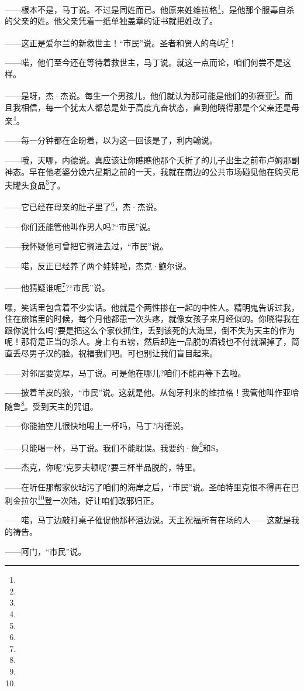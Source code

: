 \par ——根本不是，马丁说。不过是同姓而已。他原来姓维拉格\footnote{}，是他那个服毒自杀的父亲的姓。他父亲凭着一纸单独盖章的证书就把姓改了。
\par ——这正是爱尔兰的新救世主！“市民”说。圣者和贤人的岛屿\footnote{}！
\par ——喏，他们至今还在等待着救世主，马丁说。就这一点而论，咱们何尝不是这样。
\par ——是呀，杰·杰说。每生一个男孩儿，他们就认为那可能是他们的弥赛亚\footnote{}。而且我相信，每一个犹太人都总是处于高度亢奋状态，直到他晓得那是个父亲还是母亲\footnote{}。
\par ——每一分钟都在企盼着，以为这一回该是了，利内翰说。
\par ——哦，天哪，内德说。真应该让你瞧瞧他那个夭折了的儿子出生之前布卢姆那副神态。早在他老婆分娩六星期之前的一天，我就在南边的公共市场碰见他在购买尼夫罐头食品\footnote{}了。
\par ——它已经在母亲的肚子里了\footnote{}，杰·杰说。
\par ——你们还能管他叫作男人吗?“市民”说。
\par ——我怀疑他可曾把它搁进去过，“市民”说。
\par ——喏，反正已经养了两个娃娃啦，杰克·鲍尔说。
\par ——他猜疑谁呢\footnote{}?“市民”说。
\par 嘿，笑话里包含着不少实话。他就是个两性掺在一起的中性人。精明鬼告诉过我，住在旅馆里的时候，每个月他都患一次头疼，就像女孩子来月经似的。你晓得我在跟你说什么吗?要是把这么个家伙抓住，丢到该死的大海里，倒不失为天主的作为呢！那将是正当的杀人。身上有五镑，然后却连一品脱的酒钱也不付就溜掉了，简直丢尽男子汉的脸。祝福我们吧。可也别让我们盲目起来。
\par ——对邻居要宽厚，马丁说。可是他在哪儿?咱们不能再等下去啦。
\par ——披着羊皮的狼，“市民”说。这就是他。从匈牙利来的维拉格！我管他叫作亚哈随鲁\footnote{}。受到天主的咒诅。
\par ——你能抽空儿很快地喝上一杯吗，马丁?内德说。
\par ——只能喝一杯，马丁说。我们不能耽误。我要约·詹\footnote{}和S。
\par ——杰克，你呢?克罗夫顿呢?要三杯半品脱的，特里。
\par ——在听任那帮家伙玷污了咱们的海岸之后，“市民”说。圣帕特里克恨不得再在巴利金拉尔\footnote{}登一次陆，好让咱们改邪归正。
\par ——喏，马丁边敲打桌子催促他那杯酒边说。天主祝福所有在场的人——这就是我的祷告。
\par ——阿门，“市民”说。
